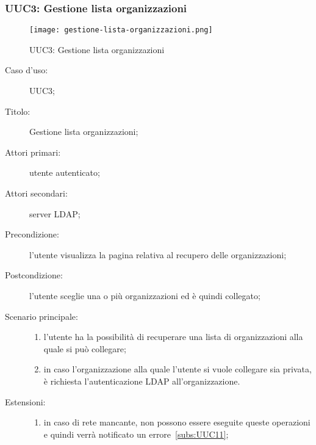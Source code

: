\documentclass[../../../analisi-dei-requisiti.tex]{subfiles}
\begin{document}
\subsubsection{UUC3: Gestione lista organizzazioni}%
\label{subs:UUC3}

\begin{figure}[H]
  \centering
  \texttt{[image: gestione-lista-organizzazioni.png]}
  \caption{UUC3: Gestione lista organizzazioni}%
  \label{fig:UUC3}
\end{figure}

\begin{description}
  \item[Caso d’uso:] UUC3;
  \item[Titolo:] Gestione lista organizzazioni;
  \item[Attori primari:] utente autenticato;
  \item[Attori secondari:] server LDAP\@;
  \item[Precondizione:] l'utente visualizza la pagina relativa al recupero delle organizzazioni;
  \item[Postcondizione:] l'utente sceglie una o più organizzazioni ed è quindi collegato;
  \item[Scenario principale:]
        \begin{enumerate}
          \item l'utente ha la possibilità di recuperare una lista di organizzazioni alla quale si può collegare;
          \item in caso l'organizzazione alla quale l'utente si vuole collegare sia privata, è richiesta l'autenticazione LDAP all'organizzazione.
        \end{enumerate}
  \item[Estensioni:]
        \begin{enumerate}
          \item in caso di rete mancante, non possono essere eseguite queste operazioni e quindi verrà notificato un errore~\ref{subs:UUC11};
        \end{enumerate}
\end{description}
\end{document}
